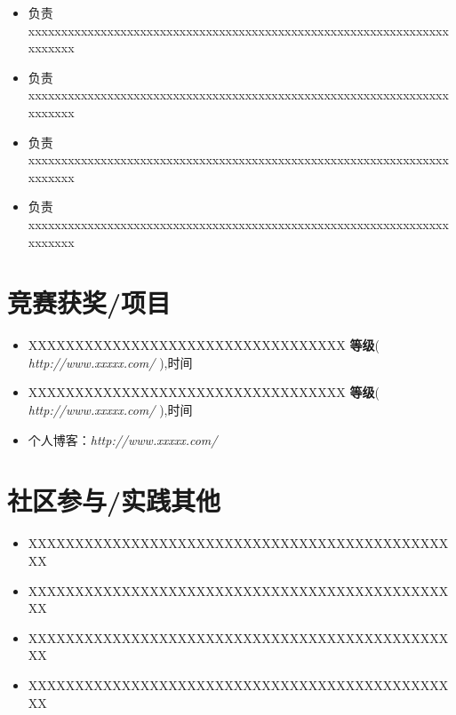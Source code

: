 \documentclass{resume}
\begin{document}
\begin{itemize}
  \item 负责xxxxxxxxxxxxxxxxxxxxxxxxxxxxxxxxxxxxxxxxxxxxxxxxxxxxxxxxxxxxxxxxxxxxxxx
  \item 负责xxxxxxxxxxxxxxxxxxxxxxxxxxxxxxxxxxxxxxxxxxxxxxxxxxxxxxxxxxxxxxxxxxxxxxx
\end{itemize}

\begin{itemize}
  \item 负责xxxxxxxxxxxxxxxxxxxxxxxxxxxxxxxxxxxxxxxxxxxxxxxxxxxxxxxxxxxxxxxxxxxxxxx
  \item 负责xxxxxxxxxxxxxxxxxxxxxxxxxxxxxxxxxxxxxxxxxxxxxxxxxxxxxxxxxxxxxxxxxxxxxxx
\end{itemize}

\section{竞赛获奖/项目}
\begin{itemize}[parsep=0.2ex]
  \item XXXXXXXXXXXXXXXXXXXXXXXXXXXXXXXXXX \textbf{等级}( \textit{http://www.xxxxx.com/} ),时间
  \item XXXXXXXXXXXXXXXXXXXXXXXXXXXXXXXXXX \textbf{等级}( \textit{http://www.xxxxx.com/} ),时间
  \item 个人博客：\textit{http://www.xxxxx.com/}
\end{itemize}

\section{社区参与/实践其他}
\begin{itemize}[parsep=0.2ex]
  \item XXXXXXXXXXXXXXXXXXXXXXXXXXXXXXXXXXXXXXXXXXXXXXX
  \item XXXXXXXXXXXXXXXXXXXXXXXXXXXXXXXXXXXXXXXXXXXXXXX
  \item XXXXXXXXXXXXXXXXXXXXXXXXXXXXXXXXXXXXXXXXXXXXXXX
  \item XXXXXXXXXXXXXXXXXXXXXXXXXXXXXXXXXXXXXXXXXXXXXXX
\end{itemize}

%
%
\end{document}
